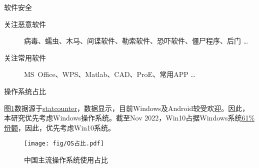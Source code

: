 \begin{frame}{软件安全}
        \begin{description}
        \item[关注恶意软件] 病毒、蠕虫、木马、间谍软件、勒索软件、恐吓软件、僵尸程序、后门 \ldots
        \item[关注常用软件] MS Office、WPS、Matlab、CAD、ProE、常用APP \ldots
    \end{description}
\end{frame}

\begin{frame}{操作系统占比}
    \begin{minipage}[c]{0.4\linewidth}
        图\ref{fig:中国主流操作系统使用占比}数据源于\href{https://gs.statcounter.com/os-market-share/all/china}{statcounter}，数据显示，目前Windows及Android较受欢迎。因此，本研究优先考虑\alert{Windows}操作系统。截至Nov 2022，Win10占据Windows系统\href{https://gs.statcounter.com/os-version-market-share/windows/desktop/china}{61\%份额}，因此，优先考虑Win10系统。
    \end{minipage}
    \begin{minipage}{0.55\linewidth}
        \medskip
        \begin{figure}[ht]
            \centering
            \texttt{[image: fig/OS占比.pdf]}
            \caption{中国主流操作系统使用占比}
            \label{fig:中国主流操作系统使用占比}
        \end{figure} 
    \end{minipage}
\end{frame}

